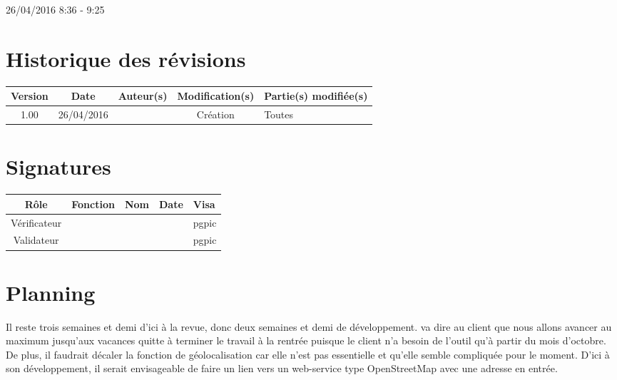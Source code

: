 \documentclass [a4paper] {article}
\begin{document}
26/04/2016			 				%
\hfill   
\hfill 	 8:36 - 9:25				%



\section*{Historique des révisions}
\begin{center}
			\begin{tabular}{| c | c | c | c | p{4cm} |}
				\hline
				\rowcolor{Gray}
				Version & Date & Auteur(s) & Modification(s) & Partie(s) modifiée(s)		 \\
				\hline
				1.00 & 26/04/2016 & \Pierre & Création & Toutes \\
		\hline		
			\end{tabular}
		\end{center}

\section*{Signatures}

		\begin{center}
			\begin{tabular}{| c | c | c | c | p{4cm} |}
				\hline
				\rowcolor{Gray}
				Rôle & Fonction & Nom & Date & Visa		 \\
				\hline
				Vérificateur & \RQA & \Kafui &  & pgpic \\[30pt]
				\hline
				Validateur & \CP & \Sergi &  & pgpic \\[30pt]	
				\hline
			\end{tabular}
		\end{center}


\section{Planning}
Il reste trois semaines et demi d'ici à la revue, donc deux semaines et demi de développement. \Sergi{} va dire au client que nous allons avancer au maximum jusqu'aux vacances quitte à terminer le travail à la rentrée puisque le client n'a besoin de l'outil qu'à partir du mois d'octobre. De plus, il faudrait décaler la fonction de géolocalisation car elle n'est pas essentielle et qu'elle semble compliquée pour le moment. D'ici à son développement, il serait envisageable de faire un lien vers un web-service type OpenStreetMap avec une adresse en entrée.
\end{document}

